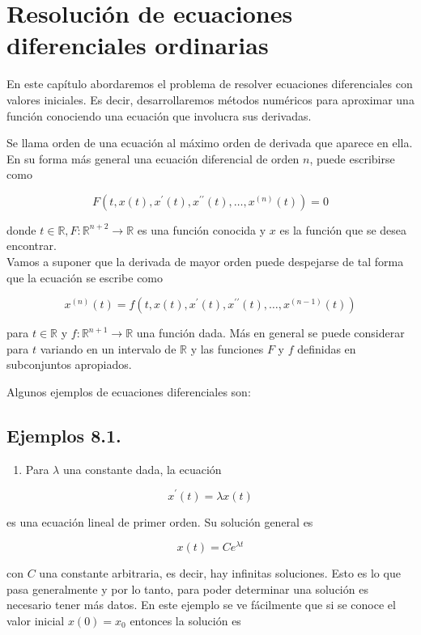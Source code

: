 \documentclass[10pt]{book}
\begin{document}
\chapter{Resolución de ecuaciones diferenciales ordinarias}
En este capítulo abordaremos el problema de resolver ecuaciones diferenciales con valores iniciales. Es decir, desarrollaremos métodos numéricos para aproximar una función conociendo una ecuación que involucra sus derivadas.

Se llama orden de una ecuación al máximo orden de derivada que aparece en ella. En su forma más general una ecuación diferencial de orden $n$, puede escribirse como

$$
F\left(t, x(t), x^{\prime}(t), x^{\prime \prime}(t), \ldots, x^{(n)}(t)\right)=0
$$

donde $t \in \mathbb{R}, F: \mathbb{R}^{n+2} \rightarrow \mathbb{R}$ es una función conocida y $x$ es la función que se desea encontrar.\\
Vamos a suponer que la derivada de mayor orden puede despejarse de tal forma que la ecuación se escribe como


\begin{equation*}
x^{(n)}(t)=f\left(t, x(t), x^{\prime}(t), x^{\prime \prime}(t), \ldots, x^{(n-1)}(t)\right) \tag{8.1}
\end{equation*}


para $t \in \mathbb{R}$ y $f: \mathbb{R}^{n+1} \rightarrow \mathbb{R}$ una función dada. Más en general se puede considerar para $t$ variando en un intervalo de $\mathbb{R}$ y las funciones $F$ y $f$ definidas en subconjuntos apropiados.

Algunos ejemplos de ecuaciones diferenciales son:

\section*{Ejemplos 8.1.}
\begin{enumerate}
  \item Para $\lambda$ una constante dada, la ecuación
\end{enumerate}

$$
x^{\prime}(t)=\lambda x(t)
$$

es una ecuación lineal de primer orden. Su solución general es

$$
x(t)=C e^{\lambda t}
$$

con $C$ una constante arbitraria, es decir, hay infinitas soluciones. Esto es lo que pasa generalmente y por lo tanto, para poder determinar una solución es necesario tener más datos. En este ejemplo se ve fácilmente que si se conoce el valor inicial $x(0)=x_{0}$ entonces la solución es
\end{document}

